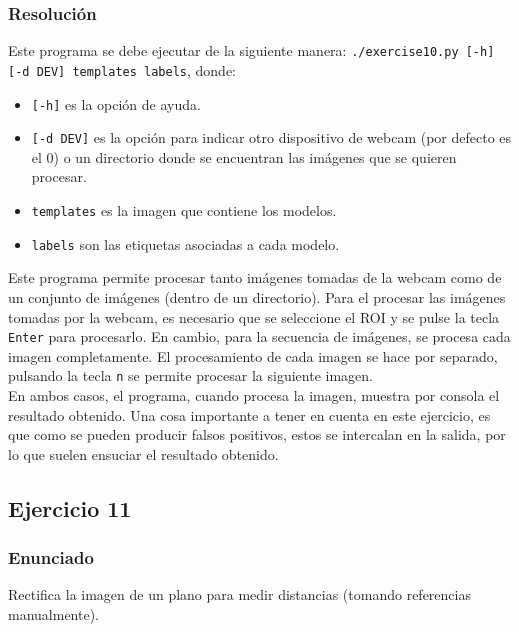 \documentclass[a4paper,10pt,titlepage,oneside,openright]{book}
\begin{document}
\subsubsection*{Resolución}
Este programa se debe ejecutar de la siguiente manera: \texttt{./exercise10.py [-h] [-d DEV] templates labels}, donde:
\begin{itemize}
 \item \texttt{[-h]} es la opción de ayuda.
 \item \texttt{[-d DEV]} es la opción para indicar otro dispositivo de webcam (por defecto es el 0) o un directorio donde se encuentran las imágenes que se quieren procesar.
 \item \texttt{templates} es la imagen que contiene los modelos.
 \item \texttt{labels} son las etiquetas asociadas a cada modelo.
\end{itemize}

Este programa permite procesar tanto imágenes tomadas de la webcam como de un conjunto de imágenes (dentro de un directorio). Para el procesar las imágenes tomadas por la webcam, es necesario que se seleccione el ROI y se pulse la tecla \texttt{Enter} para procesarlo. En cambio, para la secuencia de imágenes, se procesa cada imagen completamente. El procesamiento de cada imagen se hace por separado, pulsando la tecla \texttt{n} se permite procesar la siguiente imagen. \\

En ambos casos, el programa, cuando procesa la imagen, muestra por consola el resultado obtenido. Una cosa importante a tener en cuenta en este ejercicio, es que como se pueden producir falsos positivos, estos se intercalan en la salida, por lo que suelen ensuciar el resultado obtenido.


\medskip
\subsection{Ejercicio 11}

\subsubsection*{Enunciado}
Rectifica la imagen de un plano para medir distancias (tomando referencias manualmente).
\end{document}

